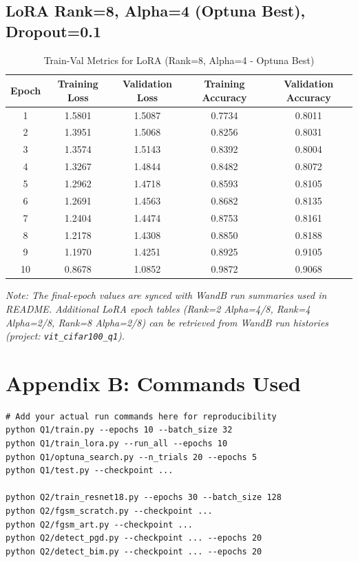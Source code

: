 \documentclass[11pt,a4paper]{article}
\begin{document}
\subsection*{LoRA Rank=8, Alpha=4 (Optuna Best), Dropout=0.1}
\begin{table}[H]
\centering
\caption{Train-Val Metrics for LoRA (Rank=8, Alpha=4 - Optuna Best)}
\begin{tabular}{c c c c c}
\toprule
Epoch & Training Loss & Validation Loss & Training Accuracy & Validation Accuracy \\
\midrule
1 & 1.5801 & 1.5087 & 0.7734 & 0.8011 \\
2 & 1.3951 & 1.5068 & 0.8256 & 0.8031 \\
3 & 1.3574 & 1.5143 & 0.8392 & 0.8004 \\
4 & 1.3267 & 1.4844 & 0.8482 & 0.8072 \\
5 & 1.2962 & 1.4718 & 0.8593 & 0.8105 \\
6 & 1.2691 & 1.4563 & 0.8682 & 0.8135 \\
7 & 1.2404 & 1.4474 & 0.8753 & 0.8161 \\
8 & 1.2178 & 1.4308 & 0.8850 & 0.8188 \\
9 & 1.1970 & 1.4251 & 0.8925 & 0.9105 \\
10 & 0.8678 & 1.0852 & 0.9872 & 0.9068 \\
\bottomrule
\end{tabular}
\end{table}

\textit{Note: The final-epoch values are synced with WandB run summaries used in README. Additional LoRA epoch tables (Rank=2 Alpha=4/8, Rank=4 Alpha=2/8, Rank=8 Alpha=2/8) can be retrieved from WandB run histories (project: \texttt{vit\_cifar100\_q1}).}

\section*{Appendix B: Commands Used}
\begin{verbatim}
# Add your actual run commands here for reproducibility
python Q1/train.py --epochs 10 --batch_size 32
python Q1/train_lora.py --run_all --epochs 10
python Q1/optuna_search.py --n_trials 20 --epochs 5
python Q1/test.py --checkpoint ...

python Q2/train_resnet18.py --epochs 30 --batch_size 128
python Q2/fgsm_scratch.py --checkpoint ...
python Q2/fgsm_art.py --checkpoint ...
python Q2/detect_pgd.py --checkpoint ... --epochs 20
python Q2/detect_bim.py --checkpoint ... --epochs 20
\end{verbatim}
\end{document}
